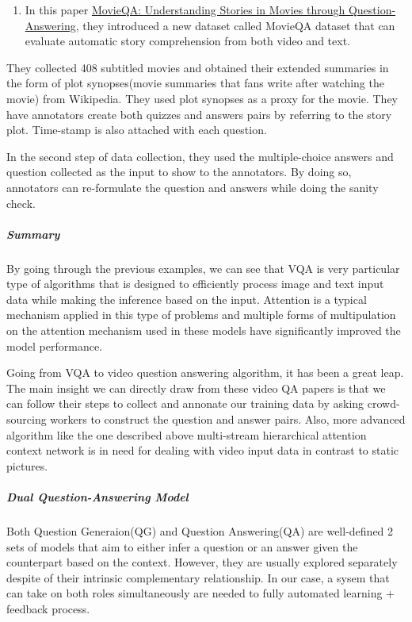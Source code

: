 \documentclass{acm_proc_article-sp}
\providecommand{\tightlist}{%
  \setlength{\itemsep}{0pt}\setlength{\parskip}{0pt}}
\begin{document}
\begin{enumerate}
\def\labelenumi{\arabic{enumi}.}
\setcounter{enumi}{1}
\tightlist
\item
  In this paper \href{https://arxiv.org/pdf/1512.02902.pdf}{MovieQA:
  Understanding Stories in Movies through Question-Answering}, they
  introduced a new dataset called MovieQA dataset that can evaluate
  automatic story comprehension from both video and text.
\end{enumerate}

They collected 408 subtitled movies and obtained their extended
summaries in the form of plot synopses(movie summaries that fans write
after watching the movie) from Wikipedia. They used plot synopses as a
proxy for the movie. They have annotators create both quizzes and
answers pairs by referring to the story plot. Time-stamp is also
attached with each question.

In the second step of data collection, they used the multiple-choice
answers and question collected as the input to show to the annotators.
By doing so, annotators can re-formulate the question and answers while
doing the sanity check.

\subparagraph{Summary}\label{summary-1}

By going through the previous examples, we can see that VQA is very
particular type of algorithms that is designed to efficiently process
image and text input data while making the inference based on the input.
Attention is a typical mechanism applied in this type of problems and
multiple forms of multipulation on the attention mechanism used in these
models have significantly improved the model performance.

Going from VQA to video question answering algorithm, it has been a
great leap. The main insight we can directly draw from these video QA
papers is that we can follow their steps to collect and annonate our
training data by asking crowd-sourcing workers to construct the question
and answer pairs. Also, more advanced algorithm like the one described
above multi-stream hierarchical attention context network is in need for
dealing with video input data in contrast to static pictures.

\subparagraph{Dual Question-Answering
Model}\label{dual-question-answering-model}

Both Question Generaion(QG) and Question Answering(QA) are well-defined
2 sets of models that aim to either infer a question or an answer given
the counterpart based on the context. However, they are usually explored
separately despite of their intrinsic complementary relationship. In our
case, a sysem that can take on both roles simultaneously are needed to
fully automated learning + feedback process.
\end{document}
